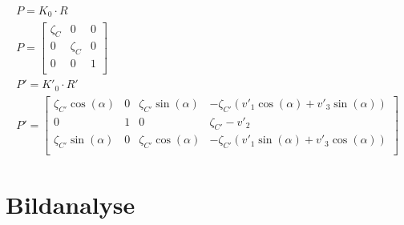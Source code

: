 \begin{gather}
P = K_0\cdot R \\
P =
\begin{bmatrix}
\zeta_{C}&0&0\\
0&\zeta_{C}&0\\
0&0&1\\
\end{bmatrix}\\
P' = K'_0 \cdot R'\\
P' =
\begin{bmatrix}
\zeta_{C'} \cos(\alpha)&0&\zeta_{C'} \sin(\alpha)&-\zeta_{C'} (v'_1\cos(\alpha)+v'_3\sin(\alpha) )\\
0&1&0&\zeta_{C'}-v'_2\\
\zeta_{C'}\sin(\alpha)&0&\zeta_{C'}\cos(\alpha)&-\zeta_{C'}(v'_1\sin(\alpha)+v'_3\cos(\alpha))\\
\end{bmatrix}
\end{gather}



%




\section{Bildanalyse}
\label{sec:MinimalFun}

